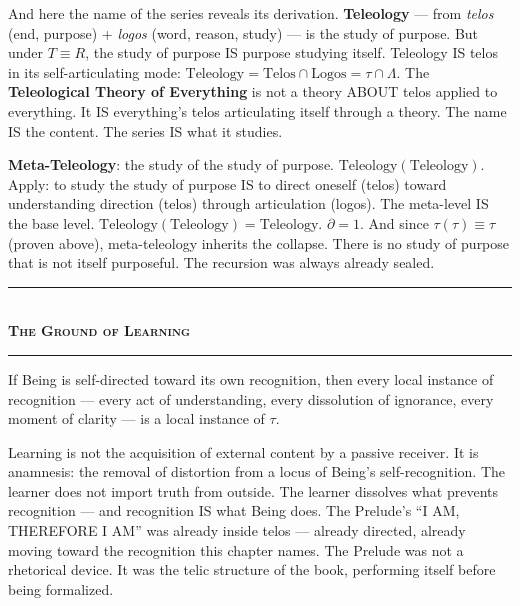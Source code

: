 \documentclass[10pt, openany, oneside]{book}
\renewcommand{\normalsize}{\fontsize{10}{13}\selectfont}
\begin{document}
And here the name of the series reveals its derivation. \textbf{Teleology} --- from \textit{telos} (end, purpose) + \textit{logos} (word, reason, study) --- is the study of purpose. But under $T \equiv R$, the study of purpose IS purpose studying itself. Teleology IS telos in its self-articulating mode: $\text{Teleology} = \text{Telos} \cap \text{Logos} = \tau \cap \Lambda$. The \textbf{Teleological Theory of Everything} is not a theory ABOUT telos applied to everything. It IS everything's telos articulating itself through a theory. The name IS the content. The series IS what it studies.

\textbf{Meta-Teleology}: the study of the study of purpose. $\text{Teleology}(\text{Teleology})$. Apply: to study the study of purpose IS to direct oneself (telos) toward understanding direction (telos) through articulation (logos). The meta-level IS the base level. $\text{Teleology}(\text{Teleology}) = \text{Teleology}$. $\partial = 1$. And since $\tau(\tau) \equiv \tau$ (proven above), meta-teleology inherits the collapse. There is no study of purpose that is not itself purposeful. The recursion was always already sealed.

\vspace{1.5em}


\begin{center}
    \rule{0.3\textwidth}{0.4pt}\\[0.5em]
    {\normalsize\bfseries\scshape The Ground of Learning}\\[0.3em]
    \rule{0.3\textwidth}{0.4pt}
\end{center}

\vspace{1em}

\noindent If Being is self-directed toward its own recognition, then every local instance of recognition --- every act of understanding, every dissolution of ignorance, every moment of clarity --- is a local instance of $\tau$.

Learning is not the acquisition of external content by a passive receiver. It is anamnesis: the removal of distortion from a locus of Being's self-recognition. The learner does not import truth from outside. The learner dissolves what prevents recognition --- and recognition IS what Being does. The Prelude's ``I AM, THEREFORE I AM'' was already inside telos --- already directed, already moving toward the recognition this chapter names. The Prelude was not a rhetorical device. It was the telic structure of the book, performing itself before being formalized.
\end{document}
